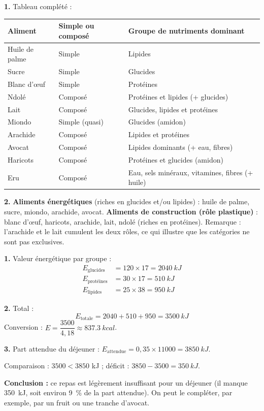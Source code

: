 \documentclass[11pt]{article}
\begin{document}
\begin{corrige}
\textbf{1.} Tableau complété :

\begin{center}
\begin{tabularx}{\linewidth}{|l|X|X|}
\hline
\rowcolor{popblueL} \textbf{Aliment} & \textbf{Simple ou composé} & \textbf{Groupe de nutriments dominant} \\
\hline
Huile de palme & Simple & Lipides \\
\hline
Sucre & Simple & Glucides \\
\hline
Blanc d'œuf & Simple & Protéines \\
\hline
Ndolé & Composé & Protéines et lipides (+ glucides) \\
\hline
Lait & Composé & Glucides, lipides et protéines \\
\hline
Miondo & Simple (quasi) & Glucides (amidon) \\
\hline
Arachide & Composé & Lipides et protéines \\
\hline
Avocat & Composé & Lipides dominants (+ eau, fibres) \\
\hline
Haricots & Composé & Protéines et glucides (amidon) \\
\hline
Eru & Composé & Eau, sels minéraux, vitamines, fibres (+ huile) \\
\hline
\end{tabularx}
\end{center}

\textbf{2.} \textbf{Aliments énergétiques} (riches en glucides et/ou lipides) : huile de palme, sucre, miondo, arachide, avocat. \textbf{Aliments de construction (rôle plastique)} : blanc d'œuf, haricots, arachide, lait, ndolé (riches en protéines). Remarque : l'arachide et le lait cumulent les deux rôles, ce qui illustre que les catégories ne sont pas exclusives.
\end{corrige}

\begin{corrige}
\textbf{1.} Valeur énergétique par groupe :
\begin{align*}
E_{\text{glucides}} &= 120 \times 17 = \SI{2040}{kJ}\\
E_{\text{protéines}} &= 30 \times 17 = \SI{510}{kJ}\\
E_{\text{lipides}} &= 25 \times 38 = \SI{950}{kJ}
\end{align*}

\textbf{2.} Total :
\[E_{\text{totale}} = 2040 + 510 + 950 = \SI{3500}{kJ}\]
Conversion : $E = \dfrac{3500}{4{,}18} \approx \SI{837,3}{kcal}$.

\textbf{3.} Part attendue du déjeuner : $E_{\text{attendue}} = 0{,}35 \times 11000 = \SI{3850}{kJ}$.

Comparaison : $3500 < 3850$ kJ ; déficit : $3850 - 3500 = \SI{350}{kJ}$.

\textbf{Conclusion :} ce repas est légèrement insuffisant pour un déjeuner (il manque \SI{350}{kJ}, soit environ \SI{9}{\%} de la part attendue). On peut le compléter, par exemple, par un fruit ou une tranche d'avocat.
\end{corrige}
\end{document}
